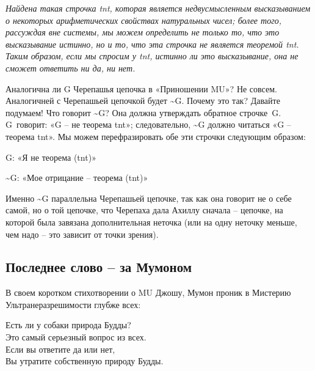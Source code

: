 \documentclass[../main.tex]{subfiles}
\begin{document}
\emph{Найдена такая строчка \acs{tnt}, которая является недвусмысленным высказыванием о некоторых арифметических свойствах натуральных чисел; более того, рассуждая вне системы, мы можем определить не только то, что это высказывание истинно, но и то, что эта строчка не является теоремой \acs{tnt}\@. Таким образом, если мы спросим у \acs{tnt}, истинно ли это высказывание, она не сможет ответить ни да, ни нет.}

Аналогична ли G Черепашья цепочка в «Приношении MU»? Не совсем. Аналогичней с Черепашьей цепочкой будет \textasciitilde G\@. Почему это так? Давайте подумаем! Что говорит \textasciitilde G? Она должна утверждать обратное строчке~G\@. G~говорит: «G \--- не теорема \acs{tnt}»; следовательно, \textasciitilde G должно читаться «G \--- теорема \acs{tnt}». Мы можем перефразировать обе эти строчки следующим образом:

G: «Я не теорема (\acs{tnt})»

\textasciitilde G: «Мое отрицание \--- теорема (\acs{tnt})»

Именно \textasciitilde G параллельна Черепашьей цепочке, так как она говорит не о себе самой, но о той цепочке, что Черепаха дала Ахиллу сначала \--- цепочке, на которой была завязана дополнительная неточка (или на одну неточку меньше, чем надо \--- это зависит от точки зрения).


\subsection{Последнее слово \--- за Мумоном}

В своем коротком стихотворении о MU Джошу, Мумон проник в Мистерию Ультранеразрешимости глубже всех:

\settowidth{\dimen42}{Вы утратите собственную природу Будды.}
\begin{koan}[center, text width=\dimen42, fontupper=\normalsize]
    Есть ли у собаки природа Будды? \\
    Это самый серьезный вопрос из всех. \\
    Если вы ответите да или нет, \\
    Вы утратите собственную природу Будды.
\end{koan}

\endgroup
\end{document}
